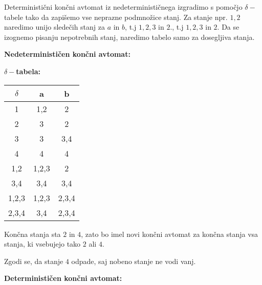 \documentclass{article}
\begin{document}
\begin{enumerate}
		Deterministični končni avtomat iz nedeterminističnega izgradimo s pomočjo
		$\delta-$tabele tako da zapišemo vse neprazne podmnožice stanj. Za stanje
		npr. $1,2$ naredimo unijo sledečih stanj za $a$ in $b$, t.j $1,2,3$ in $2$., t.j $1,2,3$ in
		$2$. Da se izognemo pisanju nepotrebnih stanj, naredimo tabelo samo za dosegljiva
		stanja.

		\textbf{Nedeterminističen končni avtomat:}


		\textbf{$\delta-$tabela:}

		\begin{tabular}{|c||c|c|}
			\hline
			$\delta$ & a & b \\
			\hline\hline
			1 & 1,2 & 2 \\
			\hline
			2 & 3 & 2 \\
			\hline
			3 & 3 & 3,4 \\
			\hline
			4 & 4 & 4 \\
			\hline
			1,2 & 1,2,3 & 2 \\
			\hline
			3,4 & 3,4 & 3,4 \\
			\hline
			1,2,3 & 1,2,3 & 2,3,4 \\
			\hline
			2,3,4 & 3,4 & 2,3,4 \\
			\hline
		\end{tabular}

		Končna stanja sta $2$ in $4$, zato bo imel novi končni avtomat za končna
		stanja vsa stanja, ki vsebujejo tako $2$ ali $4$.

		Zgodi se, da stanje $4$ odpade, saj nobeno stanje ne vodi vanj.

		\textbf{Determinističen končni avtomat:}

\end{enumerate}
\end{document}
